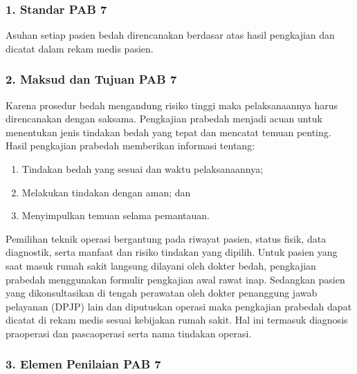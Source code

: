\documentclass[
]{book}
\providecommand{\tightlist}{%
  \setlength{\itemsep}{0pt}\setlength{\parskip}{0pt}}
\begin{document}
\hypertarget{standar-pab-7}{%
\subsubsection*{1. Standar PAB 7}\label{standar-pab-7}}

Asuhan setiap pasien bedah direncanakan berdasar atas hasil pengkajian dan dicatat dalam rekam medis pasien.

\hypertarget{maksud-dan-tujuan-pab-7}{%
\subsubsection*{2. Maksud dan Tujuan PAB 7}\label{maksud-dan-tujuan-pab-7}}

Karena prosedur bedah mengandung risiko tinggi maka pelaksanaannya harus direncanakan dengan saksama. Pengkajian prabedah menjadi acuan untuk menentukan jenis tindakan bedah yang tepat dan mencatat temuan penting. Hasil pengkajian prabedah memberikan informasi tentang:

\begin{enumerate}
\def\labelenumi{\alph{enumi}.}
\tightlist
\item
  Tindakan bedah yang sesuai dan waktu pelaksanaannya;
\item
  Melakukan tindakan dengan aman; dan
\item
  Menyimpulkan temuan selama pemantauan.
\end{enumerate}

Pemilihan teknik operasi bergantung pada riwayat pasien, status fisik, data diagnostik, serta manfaat dan risiko tindakan yang dipilih. Untuk pasien yang saat masuk rumah sakit langsung dilayani oleh dokter bedah, pengkajian prabedah menggunakan formulir pengkajian awal rawat inap. Sedangkan pasien yang dikonsultasikan di tengah perawatan oleh dokter penanggung jawab pelayanan (DPJP) lain dan diputuskan operasi maka pengkajian prabedah dapat dicatat di rekam medis sesuai kebijakan rumah sakit. Hal ini termasuk diagnosis praoperasi dan pascaoperasi serta nama tindakan operasi.

\hypertarget{elemen-penilaian-pab-7}{%
\subsubsection*{3. Elemen Penilaian PAB 7}\label{elemen-penilaian-pab-7}}
\end{document}
